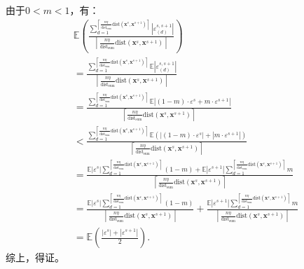 \documentclass{NauThesis}
\begin{document}
由于$0<m<1$，有：\\
$$\begin{aligned}
    &\mathbb{E}(\frac{\textstyle\sum_{d=1}^{{\left\lceil \frac{n\eta }{\text{dist}_{\text{sum}}}\text{dist}(\boldsymbol{x}^s,\boldsymbol{x}^{s+1})\right\rceil}}{|\varepsilon^{s,s+1}_{(d)}|}}{\left\lceil \frac{n\eta }{\text{dist}_{\text{sum}}}\text{dist}(\boldsymbol{x}^s,\boldsymbol{x}^{s+1})\right\rceil})\\&=
    \frac{\textstyle\sum_{d=1}^{{\left\lceil \frac{n\eta }{\text{dist}_{\text{sum}}}\text{dist}(\boldsymbol{x}^s,\boldsymbol{x}^{s+1})\right\rceil}}{
    \mathbb{E}|\varepsilon^{s,s+1}_{(d)}|}}{\left\lceil \frac{n\eta }{\text{dist}_{\text{sum}}}\text{dist}(\boldsymbol{x}^s,\boldsymbol{x}^{s+1})\right\rceil}\\&=
    \frac{\textstyle\sum_{d=1}^{{\left\lceil \frac{n\eta }{\text{dist}_{\text{sum}}}\text{dist}(\boldsymbol{x}^s,\boldsymbol{x}^{s+1})\right\rceil}}{
    \mathbb{E}|(1-m)\cdot\varepsilon^s+m\cdot\varepsilon^{s+1}|}}{\left\lceil \frac{n\eta }{\text{dist}_{\text{sum}}}\text{dist}(\boldsymbol{x}^s,\boldsymbol{x}^{s+1})\right\rceil}\\&<
    \frac{\textstyle\sum_{d=1}^{{\left\lceil \frac{n\eta }{\text{dist}_{\text{sum}}}\text{dist}(\boldsymbol{x}^s,\boldsymbol{x}^{s+1})\right\rceil}}{
    \mathbb{E}(|(1-m)\cdot\varepsilon^s|+|m\cdot\varepsilon^{s+1}|)}}{\left\lceil \frac{n\eta }{\text{dist}_{\text{sum}}}\text{dist}(\boldsymbol{x}^s,\boldsymbol{x}^{s+1})\right\rceil}\\&=
    \frac{\mathbb{E}|\varepsilon^s|\textstyle\sum_{d=1}^{{\left\lceil \frac{n\eta }{\text{dist}_{\text{sum}}}\text{dist}(\boldsymbol{x}^s,\boldsymbol{x}^{s+1})\right\rceil}}{
    (1-m)+\mathbb{E}|\varepsilon^{s+1}|}\textstyle\sum_{d=1}^{\left\lceil \frac{n\eta}{\text{dist}_{\text{sum}}}\text{dist}(\boldsymbol{x}^s,\boldsymbol{x}^{s+1})\right\rceil}m}{\left\lceil \frac{n\eta }{\text{dist}_{\text{sum}}}\text{dist}(\boldsymbol{x}^s,\boldsymbol{x}^{s+1})\right\rceil}\\
    &=
    \frac{\mathbb{E}|\varepsilon^s|\textstyle\sum_{d=1}^{{\left\lceil \frac{n\eta }{\text{dist}_{\text{sum}}}\text{dist}(\boldsymbol{x}^s,\boldsymbol{x}^{s+1})\right\rceil}}{
    (1-m)}}{\left\lceil \frac{n\eta }{\text{dist}_{\text{sum}}}\text{dist}(\boldsymbol{x}^s,\boldsymbol{x}^{s+1})\right\rceil} + \frac{{\mathbb{E}|\varepsilon^{s+1}|}\textstyle\sum_{d=1}^{\left\lceil \frac{n\eta}{\text{dist}_{\text{sum}}}\text{dist}(\boldsymbol{x}^s,\boldsymbol{x}^{s+1})\right\rceil}m}{\left\lceil \frac{n\eta }{\text{dist}_{\text{sum}}}\text{dist}(\boldsymbol{x}^s,\boldsymbol{x}^{s+1})\right\rceil}
    \\
    &=\mathbb{E}(\frac{|\varepsilon^s|+|\varepsilon^{s+1}|}{2}).
    \end{aligned}$$
综上，得证。
\end{document}
